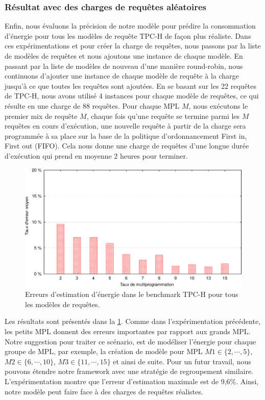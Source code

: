 \subsubsection{Résultat avec des charges de requêtes aléatoires}
Enfin, nous évaluons la précision de notre modèle pour prédire la consommation d'énergie pour tous les modèles de requête TPC-H de façon plus réaliste. Dans ces expérimentations et pour créer la charge de requêtes, nous passons par la liste de modèles de requêtes et nous ajoutons une instance de chaque modèle. En passant par la liste de modèles de nouveau d'une manière round-robin, nous continuons d'ajouter une instance de chaque modèle de requête à la charge jusqu'à ce que toutes les requêtes sont ajoutées. %
En se basant sur les 22 requêtes de TPC-H, nous avons utilisé 4 instances pour chaque modèle de requêtes, ce qui résulte en une charge de 88 requêtes. Pour chaque MPL $M$, nous exécutons le premier mix de requête $M$, chaque fois qu'une requête se termine parmi les $M$ requêtes en cours d'exécution, une nouvelle requête à partir de la charge sera programmée à sa place sur la base de la politique d'ordonnancement First in, First out (FIFO). Cela nous donne une charge de requêtes d'une longue durée d'exécution qui prend en moyenne 2 heures pour terminer.

\begin{figure}
 \centering
 \includegraphics[scale=0.6]{chapitre4/chap4Fig/tpch-test-workload.eps}
 \caption{Erreurs d'estimation d'énergie dans le benchmark TPC-H pour tous les modèles de requêtes.}
 \label{fig:tpch-test-workload}
\end{figure}

Les résultats sont présentés dans la \ref{fig:tpch-test-workload}. Comme dans l'expérimentation précédente, les petits MPL  donnent des erreurs importantes par rapport aux grands MPL. Notre suggestion pour traiter ce scénario, est de modéliser l'énergie pour chaque groupe de MPL, par exemple, la création de modèle pour MPL $M1 \in \{2, \cdots, 5\}$, $M2 \in \{6, \cdots, 10\}$, $M3 \in \{11, \cdots, 15\}$ et ainsi de suite. Pour un futur travail, nous pouvons étendre notre framework avec une stratégie de regroupement similaire.
L'expérimentation montre que l'erreur d'estimation maximale est de 9,6\%. Ainsi, notre modèle peut faire face à des charges de requêtes réalistes.

